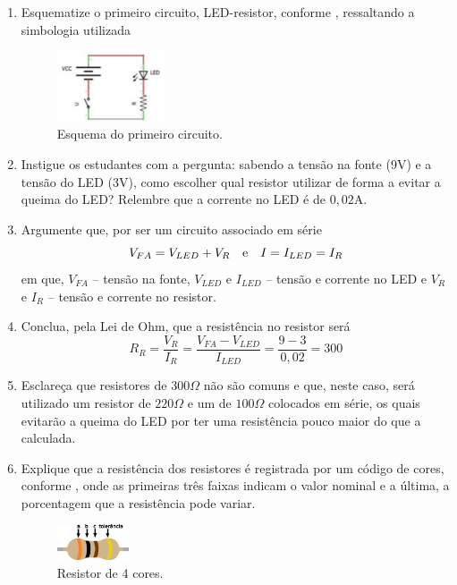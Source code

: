 \documentclass{textolivre}
\begin{document}
\begin{enumerate}
\item Esquematize o primeiro circuito, LED-resistor, conforme , ressaltando a simbologia utilizada
\begin{figure}[h!]
\centering
\includegraphics[width=0.3\textwidth]{figure-31.pdf}
\caption{Esquema do primeiro circuito.}
\label{fig21}
\end{figure}

\item Instigue os estudantes com a pergunta: sabendo a tensão na fonte (9V) e a
tensão do LED (3V), como escolher qual resistor utilizar de forma a evitar a
queima do LED?  Relembre que a corrente no LED é de $0,02$A.

\item Argumente que, por ser um circuito associado em série
\begin{equation*}
V_{FA} = V_{LED} + V_R \quad \textmd{e} \quad I = I_{LED} = I_R
\end{equation*}
em que, $V_{FA}$ -- tensão na fonte, $V_{LED}$ e $I_{LED}$ -- tensão e corrente no LED e $V_R$ e $I_R$ -- tensão e corrente no resistor.

\item Conclua, pela Lei de Ohm, que a resistência no resistor será
\begin{equation*}
R_R = \frac{V_R}{I_R} = \frac{V_{FA}-V_{LED}}{I_{LED}} = \frac{9-3}{0,02} = 300
\end{equation*}

\item Esclareça que resistores de $300\Omega$ não são comuns e que, neste caso,
será utilizado um resistor de $220\Omega$ e um de $100\Omega$ colocados em
série, os quais evitarão a queima do LED por ter uma resistência pouco maior do
que a calculada.

\item Explique que a resistência dos resistores é registrada por um código de
cores, conforme , onde as primeiras três faixas indicam o valor
nominal e a última, a porcentagem que a resistência pode variar.

\begin{figure}[h!]
\centering
\includegraphics[width=0.2\textwidth]{figure-32.pdf}
\caption{Resistor de 4 cores.}
\label{fig22}
\end{figure}


\end{enumerate}
\end{document}
